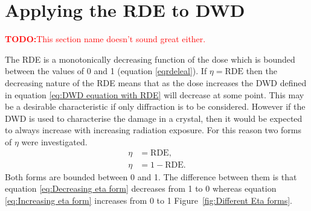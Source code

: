 \section{Applying the RDE to DWD}
\label{sec:Applying the RDE to DWD}
\textcolor{red}{
    \begin{myenumerate}
        \item \hypertarget{todo:change section name}{\textbf{TODO:}This section name doesn't sound great either.}
    \end{myenumerate}
}
The RDE is a monotonically decreasing function of the dose which is bounded between the values of 0 and 1 (equation \ref{eqrdeleal}).
If $\eta = \text{RDE}$ then the decreasing nature of the RDE means that as the dose increases the DWD defined in equation \ref{eq:DWD equation with RDE} will decrease at some point.
This may be a desirable characteristic if only diffraction is to be considered.
However if the DWD is used to characterise the damage in a crystal, then it would be expected to always increase with increasing radiation exposure.
For this reason two forms of $\eta$ were investigated.
\begin{align}
    \eta &= \text{RDE}, \label{eq:Decreasing eta form} \\
    \eta &= 1 - \text{RDE}. \label{eq:Increasing eta form}
\end{align}
Both forms are bounded between 0 and 1.
The difference between them is that equation \ref{eq:Decreasing eta form} decreases from 1 to 0 whereas equation \ref{eq:Increasing eta form} increases from 0 to 1 Figure~\ref{fig:Different Eta forms}.

